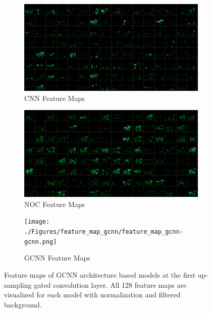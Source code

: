 \begin{figure}[H]
	\centering
	
	\begin{subfigure}[b]{\linewidth}
		\includegraphics[width=\linewidth]{./Figures/feature_map_gcnn/feature_map_gcnn-cnn.png}
		\caption{CNN Feature Maps}
	\end{subfigure}
	
	\begin{subfigure}[b]{\linewidth}
		\includegraphics[width=\linewidth]{./Figures/feature_map_gcnn/feature_map_gcnn-noc.png}
		\caption{NOC Feature Maps}
	\end{subfigure}

	\begin{subfigure}[b]{\linewidth}
	\texttt{[image: ./Figures/feature\_map\_gcnn/feature\_map\_gcnn-gcnn.png]}
	\caption{GCNN Feature Maps}
\end{subfigure}
	
	\decoRule
	\caption{Feature maps of GCNN architecture based models at the first up-sampling gated convolution layer. All 128 feature maps are visualized for each model with normalization and filtered background.}
	\label{fig:gcnn-cnn-feature map}
\end{figure}


